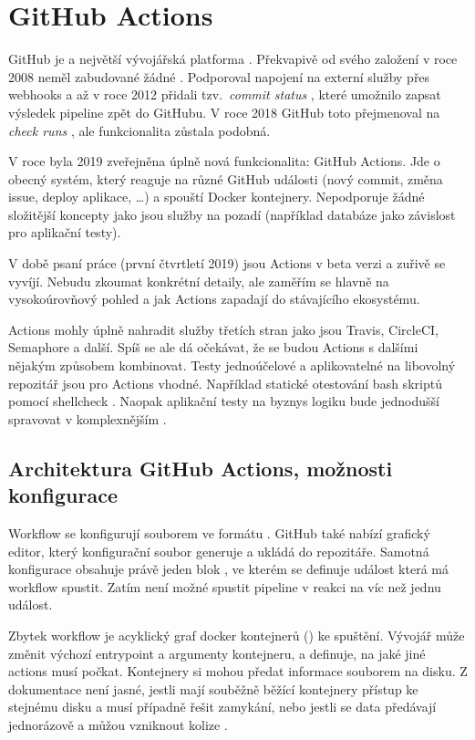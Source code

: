 \section{GitHub Actions}
    GitHub je  a největší vývojářská platforma \cite{github-about}. Překvapivě od svého založení v roce 2008 neměl zabudované žádné \CI. Podporoval napojení na externí služby přes webhooks a až v roce 2012 přidali tzv.~\textit{commit status }, které umožnilo \CI zapsat výsledek pipeline zpět do GitHubu. V roce 2018 GitHub toto přejmenoval na \textit{check runs }, ale funkcionalita zůstala podobná.

    V roce byla 2019 zveřejněna úplně nová funkcionalita: GitHub Actions. Jde o obecný systém, který reaguje na různé GitHub události (nový commit, změna issue, deploy aplikace, \ldots) a spouští Docker kontejnery. Nepodporuje žádné složitější koncepty jako jsou služby na pozadí (například databáze jako závislost pro aplikační testy).

    V době psaní práce (první čtvrtletí 2019) jsou Actions v beta verzi a zuřivě se vyvíjí. Nebudu zkoumat konkrétní detaily, ale zaměřím se hlavně na vysokoúrovňový pohled a jak Actions zapadají do stávajícího ekosystému.

    Actions mohly úplně nahradit služby třetích stran jako jsou Travis, CircleCI, Semaphore a další. Spíš se ale dá očekávat, že se budou Actions s dalšími \CI nějakým způsobem kombinovat. Testy jednoúčelové a aplikovatelné na libovolný repozitář jsou pro Actions vhodné. Například statické otestování bash skriptů pomocí shellcheck \cite{ga-shellcheck}. Naopak aplikační testy na byznys logiku bude jednodušší spravovat v komplexnějším \CI.

    \subsection{Architektura GitHub Actions, možnosti konfigurace}
        Workflow se konfigurují souborem  ve formátu . GitHub také nabízí grafický editor, který konfigurační soubor generuje a ukládá do repozitáře. Samotná konfigurace obsahuje právě jeden blok , ve kterém se definuje  událost která má workflow spustit. Zatím není možné spustit pipeline v reakci na víc než jednu událost.

        Zbytek workflow je acyklický graf docker kontejnerů () ke spuštění. Vývojář může změnit výchozí entrypoint a argumenty kontejneru, a definuje, na jaké jiné actions musí počkat. Kontejnery si mohou předat informace souborem na disku. Z dokumentace není jasné, jestli mají souběžně běžící kontejnery přístup ke stejnému disku a musí případně řešit zamykání, nebo jestli se data předávají jednorázově a můžou vzniknout kolize \cite{ga-fs}.


